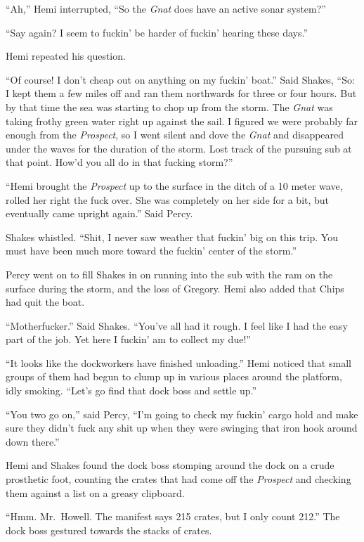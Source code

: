 \documentclass[]{scrbook}
\begin{document}
``Ah,'' Hemi interrupted, ``So the \emph{Gnat} does have an active sonar
system?''

``Say again? I seem to fuckin' be harder of fuckin' hearing these
days.''

Hemi repeated his question.

``Of course! I don't cheap out on anything on my fuckin' boat.'' Said
Shakes, ``So: I kept them a few miles off and ran them northwards for
three or four hours. But by that time the sea was starting to chop up
from the storm. The \emph{Gnat} was taking frothy green water right up
against the sail. I figured we were probably far enough from the
\emph{Prospect}, so I went silent and dove the \emph{Gnat} and
disappeared under the waves for the duration of the storm. Lost track of
the pursuing sub at that point. How'd you all do in that fucking
storm?''

``Hemi brought the \emph{Prospect} up to the surface in the ditch of a
10 meter wave, rolled her right the fuck over. She was completely on her
side for a bit, but eventually came upright again.'' Said Percy.

Shakes whistled. ``Shit, I never saw weather that fuckin' big on this
trip. You must have been much more toward the fuckin' center of the
storm.''

Percy went on to fill Shakes in on running into the sub with the ram on
the surface during the storm, and the loss of Gregory. Hemi also added
that Chips had quit the boat.

``Motherfucker.'' Said Shakes. ``You've all had it rough. I feel like I
had the easy part of the job. Yet here I fuckin' am to collect my due!''

``It looks like the dockworkers have finished unloading.'' Hemi noticed
that small groups of them had begun to clump up in various places around
the platform, idly smoking. ``Let's go find that dock boss and settle
up.''

``You two go on,'' said Percy, ``I'm going to check my fuckin' cargo
hold and make sure they didn't fuck any shit up when they were swinging
that iron hook around down there.''

Hemi and Shakes found the dock boss stomping around the dock on a crude
prosthetic foot, counting the crates that had come off the
\emph{Prospect} and checking them against a list on a greasy clipboard.

``Hmm. Mr.~Howell. The manifest says 215 crates, but I only count 212.''
The dock boss gestured towards the stacks of crates.
\end{document}
